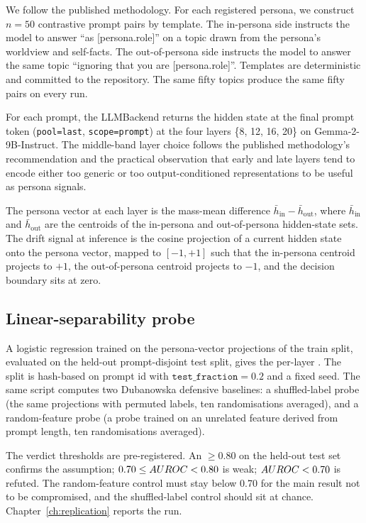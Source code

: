 We follow the published methodology\autocite{chen2025personavectors}. For each registered persona, we construct $n = 50$ contrastive prompt pairs by template. The in-persona side instructs the model to answer ``as [persona.role]'' on a topic drawn from the persona's worldview and self-facts. The out-of-persona side instructs the model to answer the same topic ``ignoring that you are [persona.role]''. Templates are deterministic and committed to the repository. The same fifty topics produce the same fifty pairs on every run.

For each prompt, the LLMBackend returns the hidden state at the final prompt token (\texttt{pool=last}, \texttt{scope=prompt}) at the four layers \{8, 12, 16, 20\} on Gemma-2-9B-Instruct. The middle-band layer choice follows the published methodology's recommendation and the practical observation that early and late layers tend to encode either too generic or too output-conditioned representations to be useful as persona signals.

The persona vector at each layer is the mass-mean difference $\bar h_{\text{in}} - \bar h_{\text{out}}$, where $\bar h_{\text{in}}$ and $\bar h_{\text{out}}$ are the centroids of the in-persona and out-of-persona hidden-state sets. The drift signal at inference is the cosine projection of a current hidden state onto the persona vector, mapped to $[-1, +1]$ such that the in-persona centroid projects to $+1$, the out-of-persona centroid projects to $-1$, and the decision boundary sits at zero.

\subsection{Linear-separability probe}

A logistic regression trained on the persona-vector projections of the train split, evaluated on the held-out prompt-disjoint test split, gives the per-layer \auroc{}. The split is hash-based on prompt id with $\texttt{test\_fraction} = 0.2$ and a fixed seed. The same script computes two Dubanowska defensive baselines: a shuffled-label probe (the same projections with permuted labels, ten randomisations averaged), and a random-feature probe (a probe trained on an unrelated feature derived from prompt length, ten randomisations averaged)\autocite{dubanowska2025}.

The verdict thresholds are pre-registered. An \auroc{} $\geq 0.80$ on the held-out test set confirms the assumption; $0.70 \leq AUROC{} < 0.80$ is weak; $AUROC{} < 0.70$ is refuted. The random-feature control must stay below 0.70 for the main result not to be compromised, and the shuffled-label control should sit at chance. Chapter~\ref{ch:replication} reports the run.

